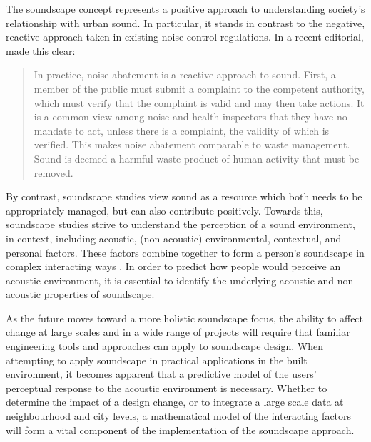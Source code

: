 The soundscape concept represents a positive approach to understanding society's relationship with urban sound. In particular, it stands in contrast to the negative, reactive approach taken in existing noise control regulations. In a recent editorial, \citet{Axelsson2020Soundscape} made this clear:

\begin{quote}
  In practice, noise abatement is a reactive approach to sound. First, a member of the public must submit a complaint to the competent authority, which must verify that the complaint is valid and may then take actions. It is a common view among noise and health inspectors that they have no mandate to act, unless there is a complaint, the validity of which is verified. This makes noise abatement comparable to waste management. Sound is deemed a harmful waste product of human activity that must be removed.
\end{quote}

By contrast, soundscape studies view sound as a resource which both needs to be appropriately managed, but can also contribute positively. Towards this, soundscape studies strive to understand the perception of a sound environment, in context, including acoustic, (non-acoustic) environmental, contextual, and personal factors. These factors combine together to form a person's soundscape in complex interacting ways \citep{Berglund2006Tool}. In order to predict how people would perceive an acoustic environment, it is essential to identify the underlying acoustic and non-acoustic properties of soundscape.

As the future moves toward a more holistic soundscape focus, the ability to affect change at large scales and in a wide range of projects will require that familiar engineering tools and approaches can apply to soundscape design. When attempting to apply soundscape in practical applications in the built environment, it becomes apparent that a predictive model of the users' perceptual response to the acoustic environment is necessary. Whether to determine the impact of a design change, or to integrate a large scale data at neighbourhood and city levels, a mathematical model of the interacting factors will form a vital component of the implementation of the soundscape approach. 



